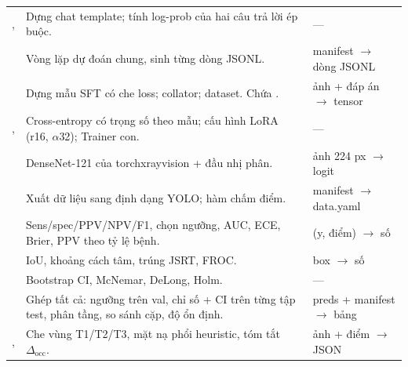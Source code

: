 \begin{center}
\begin{longtable}{@{}P{4.1cm}P{5.8cm}P{4.8cm}@{}}
,  & Dựng chat template; tính log-prob của hai câu trả lời ép buộc. & --- \\
 & Vòng lặp dự đoán chung, sinh từng dòng JSONL. & manifest $\rightarrow$ dòng JSONL \\
 & Dựng mẫu SFT có che loss; collator; dataset. Chứa . & ảnh + đáp án $\rightarrow$ tensor \\
,  & Cross-entropy có trọng số theo mẫu; cấu hình LoRA (r16, $\alpha$32); Trainer con. & --- \\
 & DenseNet-121 của torchxrayvision + đầu nhị phân. & ảnh 224 px $\rightarrow$ logit \\
 & Xuất dữ liệu sang định dạng YOLO; hàm chấm điểm. & manifest $\rightarrow$ data.yaml \\
 & Sens/spec/PPV/NPV/F1, chọn ngưỡng, AUC, ECE, Brier, PPV theo tỷ lệ bệnh. & (y, điểm) $\rightarrow$ số \\
 & IoU, khoảng cách tâm, trúng JSRT, FROC. & box $\rightarrow$ số \\
 & Bootstrap CI, McNemar, DeLong, Holm. & --- \\
 & Ghép tất cả: ngưỡng trên val, chỉ số + CI trên từng tập test, phân tầng, so sánh cặp, độ ổn định. & preds + manifest $\rightarrow$ bảng \\
,  & Che vùng T1/T2/T3, mặt nạ phổi heuristic, tóm tắt $\Delta_{\text{occ}}$. & ảnh + điểm $\rightarrow$ JSON \\
\bottomrule
\end{longtable}
\end{center}

